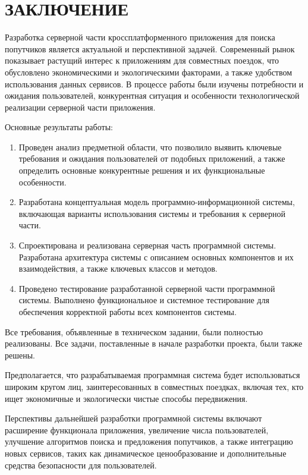 \section*{ЗАКЛЮЧЕНИЕ}

Разработка серверной части кроссплатформенного приложения для поиска попутчиков является актуальной и перспективной задачей. Современный рынок показывает растущий интерес к приложениям для совместных поездок, что обусловлено экономическими и экологическими факторами, а также удобством использования данных сервисов. В процессе работы были изучены потребности и ожидания пользователей, конкурентная ситуация и особенности технологической реализации серверной части приложения.

Основные результаты работы:
\begin{enumerate}
	\item Проведен анализ предметной области, что позволило выявить ключевые требования и ожидания пользователей от подобных приложений, а также определить основные конкурентные решения и их функциональные особенности.
	\item Разработана концептуальная модель программно-информационной системы, включающая варианты использования системы и требования к серверной части.
	\item Спроектирована и реализована серверная часть программной системы. Разработана архитектура системы с описанием основных компонентов и их взаимодействия, а также ключевых классов и методов.
	\item Проведено тестирование разработанной серверной части программной системы. Выполнено функциональное и системное тестирование для обеспечения корректной работы всех компонентов системы.
\end{enumerate}

Все требования, объявленные в техническом задании, были полностью реализованы. Все задачи, поставленные в начале разработки проекта, были также решены.

Предполагается, что разрабатываемая программная система будет использоваться широким кругом лиц, заинтересованных в совместных поездках, включая тех, кто ищет экономичные и экологически чистые способы передвижения.

Перспективы дальнейшей разработки программной системы включают расширение функционала приложения, увеличение числа пользователей, улучшение алгоритмов поиска и предложения попутчиков, а также интеграцию новых сервисов, таких как динамическое ценообразование и дополнительные средства безопасности для пользователей.